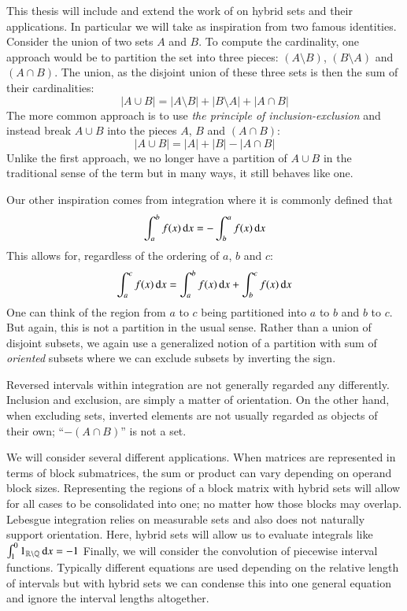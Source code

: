 This thesis will include and extend the work of \cite{carette2010} on hybrid sets and their applications.
In particular we will take as inspiration from two famous identities.
Consider the union of two sets $A$ and $B$.
To compute the cardinality, one approach would be to partition the set into three pieces:
$(A \setminus B)$, $(B \setminus A)$ and $(A \cap B)$.
The union, as the disjoint union of these three sets is then the sum of their cardinalities:
\begin{equation*}
	|A \cup B| = |A \setminus B| + |B \setminus A| + |A \cap B|
\end{equation*}
The more common approach is to use \emph{the principle of inclusion-exclusion} 
and instead break $A \cup B$ into the pieces $A$, $B$ and $(A \cap B)$:
\begin{equation}
	|A \cup B| = |A| + |B| - |A \cap B|
\end{equation}
Unlike the first approach, we no longer have a partition of $A \cup B$ in the traditional sense of the term 
but in many ways, it still behaves like one.

Our other inspiration comes from integration where it is commonly defined that
\begin{equation}
	\int_a^b f(x) \mathop{}\!\mathrm{d} x = -\int_b^a f(x) \mathop{}\!\mathrm{d} x
\end{equation}
This allows for, regardless of the ordering of $a$, $b$ and $c$:
\begin{equation*}
	\int_a^c f(x) \mathop{}\!\mathrm{d} x = \int_a^b f(x) \mathop{}\!\mathrm{d} x + \int_b^c f(x) \mathop{}\!\mathrm{d} x
\end{equation*}
One can think of the region from $a$ to $c$ being partitioned into $a$ to $b$ and $b$ to $c$.
But again, this is not a partition in the usual sense.
Rather than a union of disjoint subsets, 
we again use a generalized notion of a partition with sum of \emph{oriented} subsets where we can exclude
subsets by inverting the sign.


Reversed intervals within integration are not generally regarded any differently.
Inclusion and exclusion, are simply a matter of orientation.
On the other hand, when excluding sets, inverted elements are not usually regarded as objects of their own;
``$-(A \cap B)$'' is not a set.

We will consider several different applications.
When matrices are represented in terms of block submatrices, 
the sum or product can vary depending on operand block sizes.
Representing the regions of a block matrix with hybrid sets will allow for all cases to be consolidated into one;
no matter how those blocks may overlap.
Lebesgue integration relies on measurable sets and also does not naturally support orientation.
Here, hybrid sets will allow us to evaluate integrals like $\int_1^0 1_{\mathbb{R} \setminus \mathbb{Q}} \mathop{}\!\mathrm{d} x = -1$
Finally, we will consider the convolution of piecewise interval functions.
Typically different equations are used depending on the relative length of intervals but with hybrid sets we can condense this
into one general equation and ignore the interval lengths altogether.


